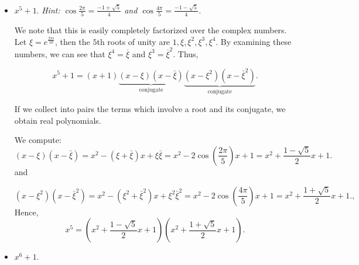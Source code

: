 \documentclass[11pt,dvipsnames]{book}
\numberwithin{equation}{section} %
\numberwithin{figure}{section} %
\numberwithin{table}{section} %
\begin{document}
\begin{exercise}
\begin{itemize}
\item $x^5+1$. {\it Hint: $\cos \frac{2\pi}{5}= \frac{-1+\sqrt{5}}{4}$ and $\cos \frac{4\pi}{5}= \frac{-1-\sqrt{5}}{4}$.}

\begin{solution}


We note that this is easily completely factorized over the complex numbers.  Let $\xi = e^{\frac{2\pi i}{10}}$, then the $5$th roots of unity are $1,\xi,\xi^2, \xi^3,\xi^4$. By examining these numbers, we can see that $\xi^{4}=\overline{\xi}$ and $\xi^{3} = \overline{\xi}^{2}$.  Thus, 

$$x^5+1 = (x+1)\underbrace{(x-\xi)(x-\bar{\xi})}_{\textrm{conjugate}}\underbrace{(x-\xi^2)(x-\bar{\xi}^2)}_{\textrm{conjugate}}.$$

If we collect into pairs the terms which involve a root and its conjugate, we obtain real polynomials.

We compute:
$$(x-\xi)(x-\bar{\xi}) = x^2 - (\xi+\bar{\xi})x + \xi\bar{\xi} = x^2 - 2\cos(\frac{2\pi}{5})x+1 
= x^2 +\frac{1-\sqrt{5}}{2}x+1.
$$ 
and 

$$(x-\xi^2)(x-\bar{\xi}^2) = x^2 -(\xi^2 + \bar{\xi}^2)x + \xi^2\bar{\xi}^2 = x^2 - 2\cos(\frac{4\pi}{5})x+1
= x^2 +\frac{1+\sqrt{5}}{2}x+1.
,$$
Hence,
\[
x^5 = \left(x^2 +\frac{1-\sqrt{5}}{2}x+1\right) \left(x^2 +\frac{1+\sqrt{5}}{2}x+1\right).
\]

\end{solution}


\item $x^6+1$. 

\begin{solution}


\end{solution}
\end{itemize}
\end{exercise}
\end{document}
